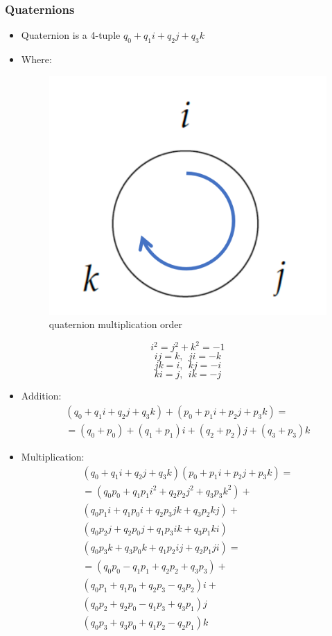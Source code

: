 \documentclass{article}
\begin{document}
\subsubsection{Quaternions}
\begin{itemize}
    \item Quaternion is a 4-tuple $ q_0 +q_1 i+ q_2 j + q_3 k $
    \item Where: \\
    \begin{figure}[h!]
    \centering
    \includegraphics[scale=0.9]{quatOrder.png}
    \caption{quaternion multiplication order}
    \label{fig:sr}
    \end{figure}
    $$ i^2 = j^2 + k^2 = -1 $$
    $$ ij=k,\:\: ji=-k $$
    $$ jk=i,\:\: kj=-i $$
    $$ ki=j,\:\: ik=-j $$
    \item Addition:
    \begin{gather*}
    (q_0+q_1i+q_2j+q_3k) + (p_0+p_1i+p_2j+p_3k) = \\
    = (q_0 + p_0) + (q_1 + p_1)i + (q_2 + p_2)j + (q_3 + p_3)k
    \end{gather*}

    \item Multiplication:
    \begin{gather*}
        (q_0+q_1i+q_2j+q_3k)(p_0+p_1i+p_2j+p_3k) = \\
        = (q_0p_0 + q_1p_1i^2 + q_2p_2j^2 + q_3p_3k^2) + \\
        (q_0p_1i + q_1p_0i + q_2p_3jk + q_3p_2kj) + \\
        (q_0p_2j + q_2p_0j + q_1p_3ik + q_3p_1ki) \\
        (q_0p_3k + q_3p_0k + q_1p_2ij + q_2p_1ji) = \\
        = (q_0p_0 - q_1p_1 + q_2p_2 + q_3p_3) + \\
        (q_0p_1 + q_1p_0 + q_2p_3 - q_3p_2)i + \\
        (q_0p_2 + q_2p_0 - q_1p_3 + q_3p_1)j \\
        (q_0p_3 + q_3p_0 + q_1p_2 - q_2p_1)k
    \end{gather*}


\end{itemize}
\end{document}
